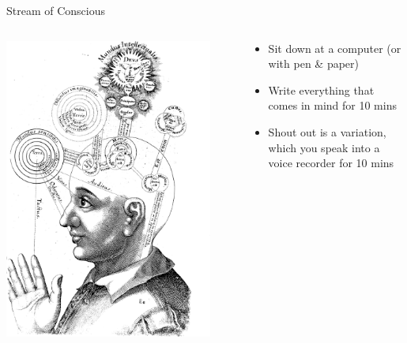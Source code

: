 \begin{frame}{Stream of Conscious}
	\begin{columns}
		\begin{column}{0.48\textwidth}
			\includegraphics[width=0.9\textwidth, height=0.7\textheight]{stream_of_conscious}
		\end{column}
		\begin{column}{0.48\textwidth}
			\begin{itemize}
				\item Sit down at a computer (or with pen \& paper)
				\item Write everything that comes in mind for 10 mins
				\item Shout out is a variation, which you speak into a voice recorder for 10 mins
			\end{itemize}
		\end{column}
	\end{columns}
\end{frame}

